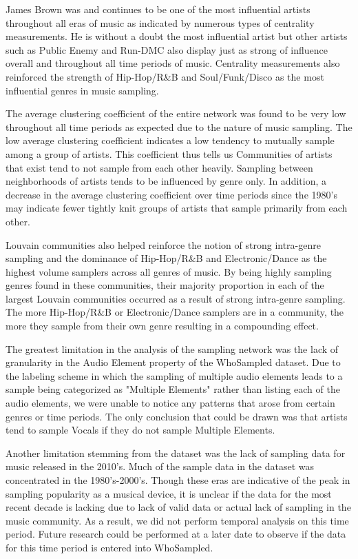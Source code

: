 \documentclass[pageno]{jpaper}
\begin{document}
James Brown was and continues to be one of the most influential artists throughout all eras of music as indicated by numerous types of centrality measurements. He is without a doubt the most influential artist but other artists such as Public Enemy and Run-DMC also display just as strong of influence overall and throughout all time periods of music. Centrality measurements also reinforced the strength of Hip-Hop/R\&B and Soul/Funk/Disco as the most influential genres in music sampling.

The average clustering coefficient of the entire network was found to be very low throughout all time periods as expected due to the nature of music sampling. The low average clustering coefficient indicates a low tendency to mutually sample among a group of artists. This coefficient thus tells us Communities of artists that exist tend to not sample from each other heavily. Sampling between neighborhoods of artists tends to be influenced by genre only. In addition, a decrease in the average clustering coefficient over time periods since the 1980's may indicate fewer tightly knit groups of artists that sample primarily from each other.

Louvain communities also helped reinforce the notion of strong intra-genre sampling and the dominance of Hip-Hop/R\&B and Electronic/Dance as the highest volume samplers across all genres of music. By being highly sampling genres found in these communities, their majority proportion in each of the largest Louvain communities occurred as a result of strong intra-genre sampling. The more Hip-Hop/R\&B or Electronic/Dance samplers are in a community, the more they sample from their own genre resulting in a compounding effect.

The greatest limitation in the analysis of the sampling network was the lack of granularity in the Audio Element property of the WhoSampled dataset. Due to the labeling scheme in which the sampling of multiple audio elements leads to a sample being categorized as "Multiple Elements" rather than listing each of the audio elements, we were unable to notice any patterns that arose from certain genres or time periods. The only conclusion that could be drawn was that artists tend to sample Vocals if they do not sample Multiple Elements.

Another limitation stemming from the dataset was the lack of sampling data for music released in the 2010's. Much of the sample data in the dataset was concentrated in the 1980's-2000's. Though these eras are indicative of the peak in sampling popularity as a musical device, it is unclear if the data for the most recent decade is lacking due to lack of valid data or actual lack of sampling in the music community. As a result, we did not perform temporal analysis on this time period. Future research could be performed at a later date to observe if the data for this time period is entered into WhoSampled.
\end{document}

